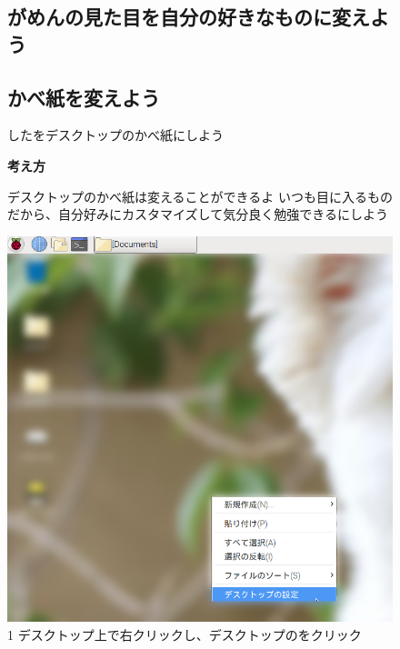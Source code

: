 \documentclass[a4paper,12pt]{jarticle}
\begin{document}
\begin{figure}
  \subsection{がめんの見た目を自分の好きなものに変えよう}
  \subsection{\theExercise かべ紙を変えよう}
  したをデスクトップのかべ紙にしよう

  \textbf{考え方}


  \bigskip



  \centering
  \begin{minipage}{\textwidth}
    \begin{minipage}{\textwidth}
      デスクトップのかべ紙は変えることができるよ
      いつも目に入るものだから、自分好みにカスタマイズして気分良く勉強できるにしよう
    \end{minipage}
    \begin{minipage}{0.45\textwidth}
      \includegraphics[width=0.85\linewidth]{textbook-img107.png}\\
      1 デスクトップ上で右クリックし、デスクトップのをクリック
    \end{minipage}
    \begin{minipage}{2.582cm}

\end{minipage}
\end{minipage}
\end{figure}
\end{document}
